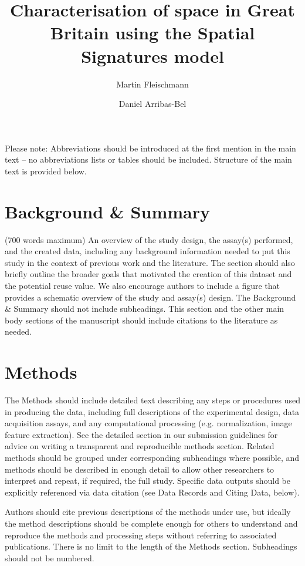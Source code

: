 \documentclass[fleqn,10pt]{wlscirep}
\title{Characterisation of space in Great Britain using the Spatial Signatures model}
\author[1, *]{Martin Fleischmann}
\author[1]{Daniel Arribas-Bel}
\affil[1]{Geographic Data Science Lab, Department of Geography and Planning, University
of Liverpool, Roxby Building , 74 Bedford St S , Liverpool , L69 7ZT, United Kingdom}
\affil[*]{corresponding author(s): Martin Fleischmann (m.fleischmann@liverpool.ac.uk)}
\begin{document}
\flushbottom
\maketitle

\thispagestyle{empty}

\noindent Please note: Abbreviations should be introduced at the first mention in the
main text – no abbreviations lists or tables should be included. Structure of the main
text is provided below.

\section*{Background \& Summary}

(700 words maximum) An overview of the study design, the assay(s) performed, and the
created data, including any background information needed to put this study in the
context of previous work and the literature. The section should also briefly outline the
broader goals that motivated the creation of this dataset and the potential reuse value.
We also encourage authors to include a figure that provides a schematic overview of the
study and assay(s) design. The Background \& Summary should not include subheadings.
This section and the other main body sections of the manuscript should include citations
to the literature as needed.



\section*{Methods}

The Methods should include detailed text describing any steps or procedures used in
producing the data, including full descriptions of the experimental design, data
acquisition assays, and any computational processing (e.g. normalization, image feature
extraction). See the detailed section in our submission guidelines for advice on writing
a transparent and reproducible methods section. Related methods should be grouped under
corresponding subheadings where possible, and methods should be described in enough
detail to allow other researchers to interpret and repeat, if required, the full study.
Specific data outputs should be explicitly referenced via data citation (see Data
Records and Citing Data, below).

Authors should cite previous descriptions of the methods under use, but ideally the
method descriptions should be complete enough for others to understand and reproduce the
methods and processing steps without referring to associated publications. There is no
limit to the length of the Methods section. Subheadings should not be numbered.
\end{document}
